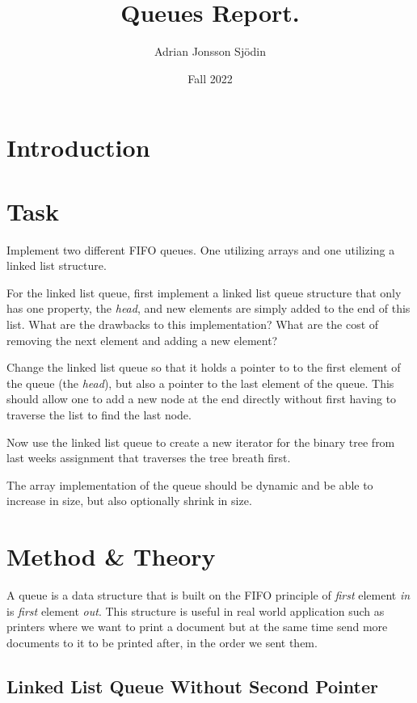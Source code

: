 \documentclass[a4paper,11pt]{article}
\begin{document}
\title{
    \textbf{Queues Report.}
}
\author{Adrian Jonsson Sjödin}
\date{Fall 2022}

\maketitle

\section{Introduction}


\section{Task}
Implement two different FIFO queues. One utilizing arrays and one utilizing a linked list structure.

For the linked list queue, first implement a linked list queue structure that only has one property,
the \textit{head}, and new elements are simply added to the end of this list. What are the drawbacks
to this implementation? What are the cost of removing the next element and adding a new element?

Change the linked list queue so that it holds a pointer to to the first element of the queue
(the \textit{head}), but also a pointer to the last element of the queue. This should allow one
to add a new node at the end directly without first having to traverse the list to find the last
node.

Now use the linked list queue to create a new iterator for the binary tree from last weeks assignment
that traverses the tree breath first.

The array implementation of the queue  should be dynamic and be able to increase in size, but also
optionally shrink in size.
\section{Method \& Theory}
A queue is a data structure that is built on the FIFO principle of \textit{first} element \textit{in} is \textit{first}
element \textit{out}. This structure is useful in real world application such as printers where we want to print a document but
at the same time send more documents to it to be printed after, in the order we sent them.
\subsection{Linked List Queue Without Second Pointer}
\end{document}
